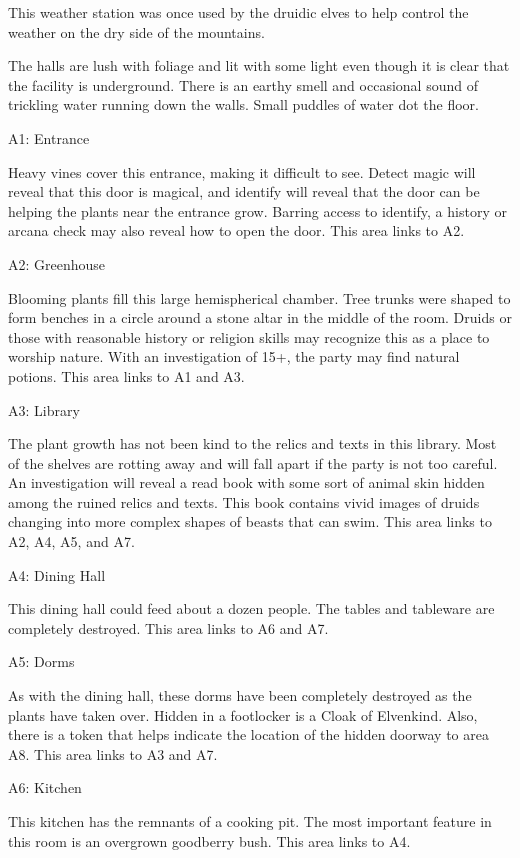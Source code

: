 This weather station was once used by the druidic elves to help control the weather on the dry side of the mountains.

The halls are lush with foliage and lit with some light even though it is clear that the facility is underground.
There is an earthy smell and occasional sound of trickling water running down the walls.
Small puddles of water dot the floor.


A1: Entrance

Heavy vines cover this entrance, making it difficult to see.
Detect magic will reveal that this door is magical, and identify will reveal that the door can be helping the plants near the entrance grow.
Barring access to identify, a history or arcana check may also reveal how to open the door.
This area links to A2.

A2: Greenhouse

Blooming plants fill this large hemispherical chamber.
Tree trunks were shaped to form benches in a circle around a stone altar in the middle of the room.
Druids or those with reasonable history or religion skills may recognize this as a place to worship nature.
With an investigation of 15+, the party may find natural potions.
This area links to A1 and A3.

A3: Library

The plant growth has not been kind to the relics and texts in this library.
Most of the shelves are rotting away and will fall apart if the party is not too careful.
An investigation will reveal a read book with some sort of animal skin hidden among the ruined relics and texts.
This book contains vivid images of druids changing into more complex shapes of beasts that can swim.
This area links to A2, A4, A5, and A7.

A4: Dining Hall

This dining hall could feed about a dozen people.
The tables and tableware are completely destroyed.
This area links to A6 and A7.

A5: Dorms

As with the dining hall, these dorms have been completely destroyed as the plants have taken over.
Hidden in a footlocker is a Cloak of Elvenkind.
Also, there is a token that helps indicate the location of the hidden doorway to area A8.
This area links to A3 and A7.

A6: Kitchen

This kitchen has the remnants of a cooking pit.
The most important feature in this room is an overgrown goodberry bush.
This area links to A4.

